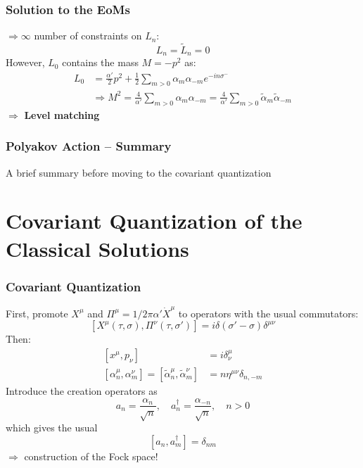 \documentclass[aspectratio=169]{beamer}
\begin{document}
	\begin{frame}
		\frametitle{Solution to the EoMs}
		$\Rightarrow \infty$ number of constraints on $L_n$: 
		\begin{equation*}
			L_n = \tilde{L}_n = 0
		\end{equation*}
		However, $L_0$ contains the mass $M = -p^2$ as:
		\begin{align*}
			L_0 &= \frac{\alpha'}{2}p^2 + \frac{1}{2} \sum_{m>0} \alpha_m \alpha_{-m} e^{-in\sigma^-} \\
			& \Rightarrow M^2 = \frac{4}{\alpha'} \sum_{m>0}\alpha_m\alpha_{-m} = \frac{4}{\alpha'} \sum_{m>0}\tilde{\alpha}_m\tilde{\alpha}_{-m}
		\end{align*}
		$\Rightarrow$ \textbf{Level matching}
	\end{frame}

	\begin{frame}
		\frametitle{Polyakov Action -- Summary}
		{\Huge \color{red} A brief summary before moving to the covariant quantization}
	\end{frame}

	\section{Covariant Quantization of the  Classical Solutions}	

	\begin{frame}
		\frametitle{Covariant Quantization}
		First, promote $X^\mu$ and $\Pi^\mu = 1/2\pi\alpha' \dot{X}^\mu$ to operators with the usual commutators:
		\begin{equation*}
			\left[X^\mu(\tau,\sigma), \Pi^\nu(\tau,\sigma')\right] = i\delta(\sigma'-\sigma)\delta^{\mu\nu}
		\end{equation*}
		Then:
		\begin{align*}
			\left[x^\mu,p_\nu\right] &= i\delta^\mu_\nu \\
			\left[\alpha^\mu_n, \alpha^\nu_m\right] = \left[\tilde{\alpha}^\mu_n, \tilde{\alpha}^\nu_m\right] &= n \eta^{\mu\nu} \delta_{n,-m}
		\end{align*}
		Introduce the creation operators as
		\begin{equation*}
			a_n = \frac{\alpha_n}{\sqrt{n}}, \quad a^\dagger_n = \frac{\alpha_{-n}}{\sqrt{n}}, \quad n>0
		\end{equation*}
		which gives the usual
		\begin{equation*}
			\left[a_n,a^\dagger_m\right] = \delta_{nm}
		\end{equation*}
		$\Rightarrow$ construction of the Fock space!
	\end{frame}
\end{document}
